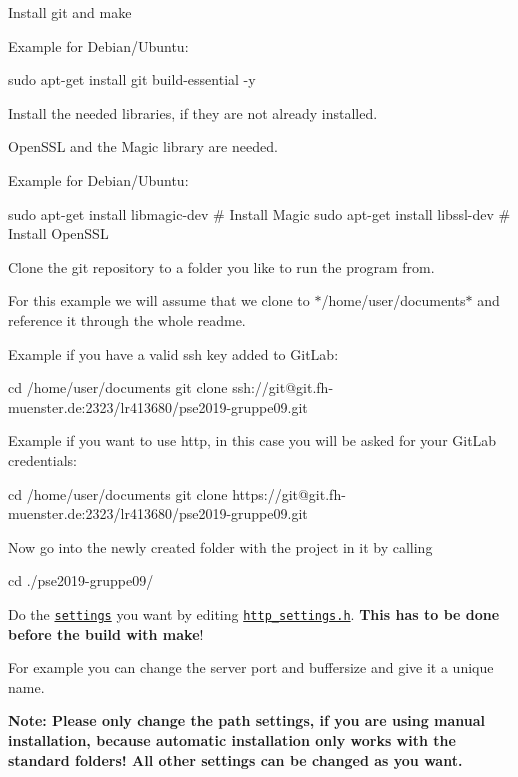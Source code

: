 \begin{DoxyEnumerate}
\item Install git and make

Example for Debian/\+Ubuntu\+: \begin{DoxyVerb}sudo apt-get install git build-essential -y
\end{DoxyVerb}

\item Install the needed libraries, if they are not already installed.

Open\+S\+SL and the Magic library are needed.

Example for Debian/\+Ubuntu\+: \begin{DoxyVerb}sudo apt-get install libmagic-dev   # Install Magic
sudo apt-get install libssl-dev     # Install OpenSSL
\end{DoxyVerb}

\item Clone the git repository to a folder you like to run the program from.

For this example we will assume that we clone to $\ast$/home/user/documents$\ast$ and reference it through the whole readme.

Example if you have a valid ssh key added to Git\+Lab\+: \begin{DoxyVerb}cd /home/user/documents
git clone ssh://git@git.fh-muenster.de:2323/lr413680/pse2019-gruppe09.git
\end{DoxyVerb}


Example if you want to use http, in this case you will be asked for your Git\+Lab credentials\+: \begin{DoxyVerb}cd /home/user/documents     
git clone https://git@git.fh-muenster.de:2323/lr413680/pse2019-gruppe09.git
\end{DoxyVerb}

\item Now go into the newly created folder with the project in it by calling \begin{DoxyVerb}cd ./pse2019-gruppe09/
\end{DoxyVerb}

\item Do the \href{#settings}{\tt settings} you want by editing \href{include/http_settings.h}{\tt http\+\_\+settings.\+h}. {\bfseries This has to be done before the build with make}!

For example you can change the server port and buffersize and give it a unique name.

{\bfseries Note\+: Please only change the path settings, if you are using manual installation, because automatic installation only works with the standard folders! All other settings can be changed as you want.}
\end{DoxyEnumerate}

